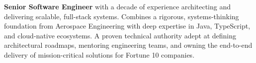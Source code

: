 \thispagestyle{empty} %

{\fontsize{26pt}{30pt}\selectfont\bfseries\RaggedRight{}\par}
\vspace{\spacingAfterHeaderName}
{\small\noindent
\href{\resumeLocationUrl}{\textcolor{colorHeadings}{}\thinspace\resumeLocation}\contactSeparator
\href{tel:\resumePhone}{\textcolor{colorHeadings}{}\thinspace\resumePhone}\contactSeparator
\href{mailto:\resumeEmail}{\textcolor{colorHeadings}{}\thinspace\resumeEmail}\contactSeparator
\href{https://\resumeLinkedIn}{\textcolor{colorHeadings}{}\thinspace\resumeLinkedIn}
\par}
\vspace{\spacingAfterHeaderContact}

\noindent \textbf{Senior Software Engineer} with a decade of experience architecting and delivering scalable, full-stack systems. Combines a rigorous, systems-thinking foundation from Aerospace Engineering with deep expertise in Java, TypeScript, and cloud-native ecosystems. A proven technical authority adept at defining architectural roadmaps, mentoring engineering teams, and owning the end-to-end delivery of mission-critical solutions for Fortune 10 companies.
\vspace{\spacingAfterHeaderContact}

